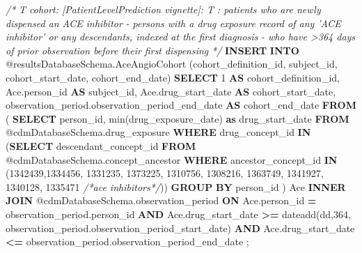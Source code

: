 \documentclass[
]{article}
\newenvironment{Shaded}{\begin{snugshade}}{\end{snugshade}}
\newcommand{\CommentTok}[1]{\textcolor[rgb]{0.56,0.35,0.01}{\textit{#1}}}
\newcommand{\DecValTok}[1]{\textcolor[rgb]{0.00,0.00,0.81}{#1}}
\newcommand{\FunctionTok}[1]{\textcolor[rgb]{0.00,0.00,0.00}{#1}}
\newcommand{\KeywordTok}[1]{\textcolor[rgb]{0.13,0.29,0.53}{\textbf{#1}}}
\newcommand{\NormalTok}[1]{#1}
\newcommand{\OperatorTok}[1]{\textcolor[rgb]{0.81,0.36,0.00}{\textbf{#1}}}
\begin{document}
\begin{Shaded}
\begin{Highlighting}[]
  
  \CommentTok{/*}
\CommentTok{    T cohort:  [PatientLevelPrediction vignette]:  T : patients who are newly }
\CommentTok{  dispensed an ACE inhibitor}
\CommentTok{  - persons with a drug exposure record of any 'ACE inhibitor' or }
\CommentTok{  any descendants, indexed at the first diagnosis}
\CommentTok{  - who have >364 days of prior observation before their first dispensing}
\CommentTok{  */}
    \KeywordTok{INSERT} \KeywordTok{INTO}\NormalTok{ @resultsDatabaseSchema.AceAngioCohort (cohort_definition_id, }
\NormalTok{                                                       subject_id, }
\NormalTok{                                                       cohort_start_date, }
\NormalTok{                                                       cohort_end_date)}
  \KeywordTok{SELECT} \DecValTok{1} \KeywordTok{AS}\NormalTok{ cohort_definition_id,}
\NormalTok{  Ace.person_id }\KeywordTok{AS}\NormalTok{ subject_id,}
\NormalTok{  Ace.drug_start_date }\KeywordTok{AS}\NormalTok{ cohort_start_date,}
\NormalTok{  observation_period.observation_period_end_date }\KeywordTok{AS}\NormalTok{ cohort_end_date}
  \KeywordTok{FROM}
\NormalTok{  (}
    \KeywordTok{SELECT}\NormalTok{ person_id, }\FunctionTok{min}\NormalTok{(drug_exposure_date) }\KeywordTok{as}\NormalTok{ drug_start_date}
    \KeywordTok{FROM}\NormalTok{ @cdmDatabaseSchema.drug_exposure}
    \KeywordTok{WHERE}\NormalTok{ drug_concept_id }\KeywordTok{IN}\NormalTok{ (}\KeywordTok{SELECT}\NormalTok{ descendant_concept_id }\KeywordTok{FROM} 
\NormalTok{                              @cdmDatabaseSchema.concept_ancestor }\KeywordTok{WHERE}\NormalTok{ ancestor_concept_id }\KeywordTok{IN} 
\NormalTok{                              (}\DecValTok{1342439}\NormalTok{,}\DecValTok{1334456}\NormalTok{, }\DecValTok{1331235}\NormalTok{, }\DecValTok{1373225}\NormalTok{, }\DecValTok{1310756}\NormalTok{, }\DecValTok{1308216}\NormalTok{, }\DecValTok{1363749}\NormalTok{, }\DecValTok{1341927}\NormalTok{, }\DecValTok{1340128}\NormalTok{, }\DecValTok{1335471} \CommentTok{/*ace inhibitors*/}\NormalTok{))}
    \KeywordTok{GROUP} \KeywordTok{BY}\NormalTok{ person_id}
\NormalTok{  ) Ace}
  \KeywordTok{INNER} \KeywordTok{JOIN}\NormalTok{ @cdmDatabaseSchema.observation_period}
  \KeywordTok{ON}\NormalTok{ Ace.person_id }\OperatorTok{=}\NormalTok{ observation_period.person_id}
  \KeywordTok{AND}\NormalTok{ Ace.drug_start_date }\OperatorTok{>=}\NormalTok{ dateadd(dd,}\DecValTok{364}\NormalTok{, }
\NormalTok{                                     observation_period.observation_period_start_date)}
  \KeywordTok{AND}\NormalTok{ Ace.drug_start_date }\OperatorTok{<=}\NormalTok{ observation_period.observation_period_end_date}
\NormalTok{  ;}
  

\end{Highlighting}
\end{Shaded}
\end{document}
